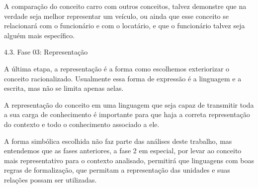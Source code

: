 A comparação do conceito carro com outros conceitos, talvez demonstre que na verdade seja melhor representar um veículo, ou ainda que esse conceito se relacionará com o funcionário e com o locatário, e que o funcionário talvez seja alguém mais específico.

4.3. Fase 03: Representação

A última etapa, a representação é a forma como escolhemos exteriorizar o conceito racionalizado. Usualmente essa forma de expressão é a linguagem e a escrita, mas não se limita apenas aelas.

A representação do conceito em uma linguagem que seja capaz de transmitir toda a sua carga de conhecimento é importante para que haja a correta representação do contexto e todo o conhecimento associado a ele.

A forma simbólica escolhida não faz parte das análises deste trabalho, mas entendemos que as fases anteriores, a fase 2 em especial, por levar ao conceito mais representativo para o contexto analisado, permitirá que linguagens com boas regras de formalização, que permitam a representação das unidades e suas relações possam ser utilizadas.